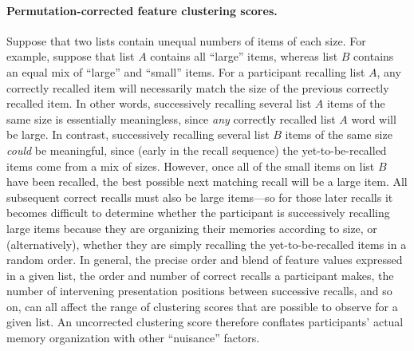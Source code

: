 \documentclass[11pt]{article}
\begin{document}
\paragraph*{Permutation-corrected feature clustering scores.}

Suppose that two lists contain unequal numbers of items of each size. For
example, suppose that list $A$ contains all ``large'' items, whereas list $B$
contains an equal mix of ``large'' and ``small'' items. For a participant
recalling list $A$, any correctly recalled item will necessarily match the size
of the previous correctly recalled item. In other words, successively recalling
several list $A$ items of the same size is essentially meaningless, since
\textit{any} correctly recalled list $A$ word will be large. In contrast,
successively recalling several list $B$ items of the same size \textit{could}
be meaningful, since (early in the recall sequence) the yet-to-be-recalled
items come from a mix of sizes. However, once all of the small items on list
$B$ have been recalled, the best possible next matching recall will be a large
item. All subsequent correct recalls must also be large items---so for those
later recalls it becomes difficult to determine whether the participant is
successively recalling large items because they are organizing their memories
according to size, or (alternatively), whether they are simply recalling the
yet-to-be-recalled items in a random order. In general, the precise order and
blend of feature values expressed in a given list, the order and number of
correct recalls a participant makes, the number of intervening presentation
positions between successive recalls, and so on, can all affect the range of
clustering scores that are possible to observe for a given list. An uncorrected
clustering score therefore conflates participants' actual memory organization
with other ``nuisance'' factors.
\end{document}
